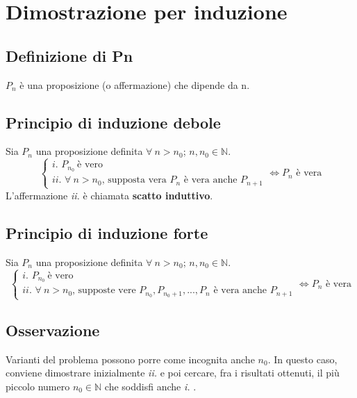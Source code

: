 \chapter{Dimostrazione per induzione}
\section{Definizione di Pn}
$P_n$ è una proposizione (o affermazione) che dipende da n.

\section{Principio di induzione debole}
Sia $P_n$ una proposizione definita $\forall\ n>n_0$;  $n,n_0 \in \mathbb{N}$.
\begin{equation}
\begin{cases}
\textit{i. }P_{n_0}\ \text{è vero}\\
\textit{ii. }\forall\ n>n_0 \text{, supposta vera } P_n \text{ è vera anche } P_{n+1}
\end{cases} \iff P_n \text{ è vera}
\end{equation}
L'affermazione \textit{ii.} è chiamata \textbf{scatto induttivo}.

\section{Principio di induzione forte}
Sia $P_n$ una proposizione definita $\forall\ n>n_0$;  $n,n_0 \in \mathbb{N}$.
\begin{equation}
\begin{cases}
\textit{i. }P_{n_0}\ \text{è vero}\\
\textit{ii. }\forall\ n>n_0 \text{, supposte vere } P_{n_0},P_{n_0+1},...,P_n \text{ è vera anche } P_{n+1}
\end{cases} \iff P_n \text{ è vera}
\end{equation}

\section{Osservazione}
Varianti del problema possono porre come incognita anche $n_0$. In questo caso, conviene dimostrare inizialmente \textit{ii.} e poi cercare, fra i risultati ottenuti, il più piccolo numero $n_0 \in \mathbb{N}$ che soddisfi anche \textit{i.} .